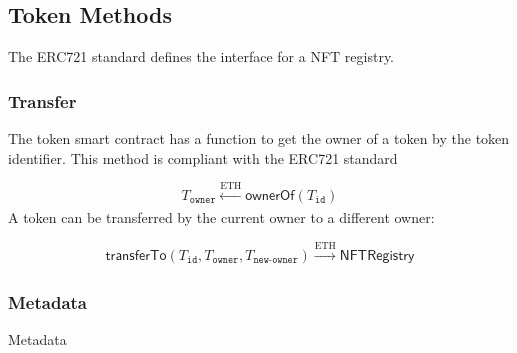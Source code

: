 \subsection{Token Methods}
The ERC721 standard defines the interface for a NFT registry.
\subsubsection{Transfer}
The token smart contract has a function to get the owner of a token by the token identifier. This method is compliant with the ERC721 standard

\begin{equation}
 T_{\mathtt{owner}} \xleftarrow[]{\text{ETH}} \mathsf{ownerOf}(T_{\texttt{id}})
\end{equation}
A token can be transferred by the current owner to a different owner:

\begin{equation}
\mathsf{transferTo}(T_{\texttt{id}},T_{\texttt{owner}},T_{\texttt{new-owner}}) \xrightarrow[]{\text{ETH}}  \mathsf{NFTRegistry}
\end{equation}
\subsubsection{Metadata}
Metadata 
 

